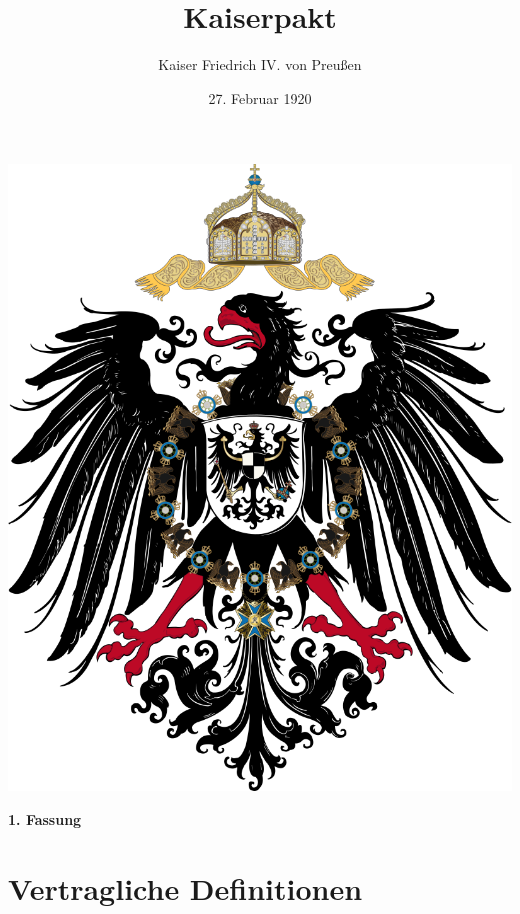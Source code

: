 \documentclass{article}
\title{Kaiserpakt}
\author{Kaiser Friedrich IV. von Preußen}
\date{27. Februar 1920}
\begin{document}
\maketitle
\begin{center}
    \includegraphics[scale=.15]{dr_wappen}
\end{center}
\newpage
{}
\vspace*{\fill}
\begin{Center}
\textbf{1. Fassung}
\vspace*{\fill}
\end{Center}
\newpage
\tableofcontents
\newpage
\section{Vertragliche Definitionen}
\end{document}
